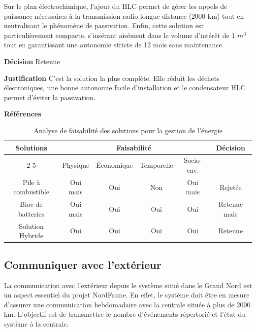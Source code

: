 Sur le plan électrochimique, l'ajout du HLC permet de gérer les appels de puissance nécessaires à la transmission radio longue distance (2000 km) tout en neutralisant le phénomène de passivation. Enfin, cette solution est particulièrement compacte, s'insérant aisément dans le volume d'intérêt de 1 $m^3$ tout en garantissant une autonomie stricte de 12 mois sans maintenance.
\smallskip

\noindent\textbf{Décision} Retenue
\smallskip

\noindent\textbf{Justification} C'est la solution la plus complète. Elle réduit les déchets électroniques, une bonne autonomie facile d’installation et le condensateur HLC permet d’éviter la passivation.
\smallskip

\noindent\textbf{Références} 
\cite{SolutionHybride1}
\cite{SolutionHybride2}
\cite{SolutionHybride3}

\begin{table}[H]
    \centering
\begin{tabular}{|c|c|c|c|c|c|}
    \hline
    \centering
    \textbf{Solutions} & \multicolumn{4}{c|}{Faisabilité} & \textbf{Décision} \\
    \cline{2-5}
    & Physique & Économique & Temporelle & Socio-env. & \\
    \hline
    Pile à combustible  & Oui mais & Oui & Non & Oui mais & Rejetée \\
    \hline
    Bloc de batteries & Oui mais & Oui & Oui & Oui & Retenue mais \\
    \hline
    Solution Hybride  & Oui & Oui & Oui & Oui & Retenue \\
    \hline
\end{tabular}
\caption{Analyse de faisabilité des solutions pour la gestion de l'énergie}
\label{tab:faisabiliteEnergie}
\end{table}


\subsection{Communiquer avec l'extérieur}
\label{CommuniquerAvecExt}
La communication avec l’extérieur depuis le système situé dans le Grand Nord est un aspect essentiel du projet NordFaune. En effet, le système doit être en mesure d’assurer une communication hebdomadaire avec la centrale située à plus de 2000 km. L'objectif est de transmettre le nombre d'événements répertorié et l'état du système à la centrale.
\bigskip

